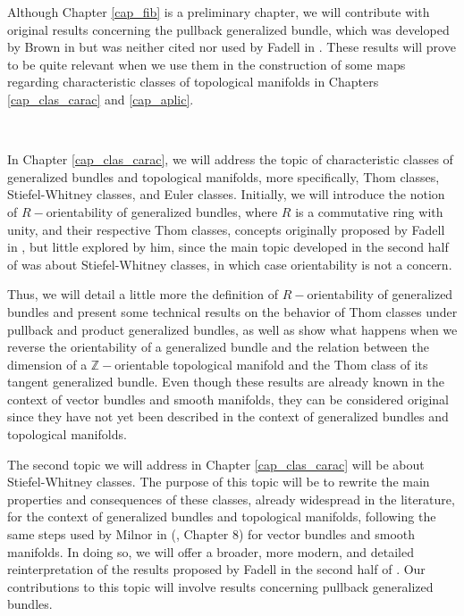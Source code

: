 \documentclass[12pt,oneside]{book}
\newcommand{\Z}{\mathbb{Z}}
\begin{document}
    Although Chapter \ref{cap_fib} is a preliminary chapter, we will contribute with original results 
    concerning the pullback generalized bundle, which was developed by Brown in \cite{brown} but was 
    neither cited nor used by Fadell in \cite{fadell_1}. These results will prove to be quite relevant 
    when we use them in the construction of some maps regarding characteristic classes of topological 
    manifolds in Chapters \ref{cap_clas_carac} and \ref{cap_aplic}.

    \

    In Chapter \ref{cap_clas_carac}, we will address the topic of characteristic classes of generalized 
    bundles and topological manifolds, more specifically, Thom classes, Stiefel-Whitney classes, and 
    Euler classes. Initially, we will introduce the notion of $R-$orientability of generalized bundles, 
    where $R$ is a commutative ring with unity, and their respective Thom classes, concepts originally 
    proposed by Fadell in \cite{fadell_1}, but little explored by him, since the main topic developed 
    in the second half of \cite{fadell_1} was about Stiefel-Whitney classes, in which case orientability 
    is not a concern.

    Thus, we will detail a little more the definition of $R-$orientability of generalized bundles and 
    present some technical results on the behavior of Thom classes under pullback and product generalized 
    bundles, as well as show what happens when we reverse the orientability of a generalized bundle and 
    the relation between the dimension of a $\Z-$orientable topological manifold and the Thom class of 
    its tangent generalized bundle. Even though these results are already known in the context of vector 
    bundles and smooth manifolds, they can be considered original since they have not yet been described 
    in the context of generalized bundles and topological manifolds.

    The second topic we will address in Chapter \ref{cap_clas_carac} will be about Stiefel-Whitney 
    classes. The purpose of this topic will be to rewrite the main properties and consequences of these 
    classes, already widespread in the literature, for the context of generalized bundles and topological 
    manifolds, following the same steps used by Milnor in (\cite{milnor_1}, Chapter 8) for vector bundles 
    and smooth manifolds. In doing so, we will offer a broader, more modern, and detailed reinterpretation 
    of the results proposed by Fadell in the second half of \cite{fadell_1}. Our contributions to this 
    topic will involve results concerning pullback generalized bundles.
\end{document}
